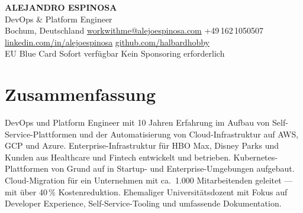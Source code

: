 \documentclass[a4paper,9pt]{extarticle}
\begin{document}
\color{darktext}
\thispagestyle{firstpage}


\noindent
{}%
\vspace*{-1.0cm}
\begin{center}
  {\LARGE\bfseries\color{headerwhite}ALEJANDRO ESPINOSA}\\[0.3em]
  {\large\lightfont\color{accent}DevOps \& Platform Engineer}\\[0.55em]
  {\small\color{headerwhite}%
    Bochum, Deutschland\enspace{\color{accent}|}\enspace
    \href{mailto:workwithme@alejoespinosa.com}{\color{headerwhite}workwithme@alejoespinosa.com}\enspace{\color{accent}|}\enspace
    +49\,162\,1050507\\[0.2em]
    \href{https://www.linkedin.com/in/alejoespinosa}{\color{headerwhite}linkedin.com/in/alejoespinosa}\enspace{\color{accent}|}\enspace
    \href{https://github.com/halbardhobby}{\color{headerwhite}github.com/halbardhobby}
  }\\[0.45em]
  {\small\mediumfont\color{accent}EU Blue Card\enspace{\color{headerwhite}|}\enspace
  \color{accent}Sofort verf\"ugbar\enspace{\color{headerwhite}|}\enspace
  \color{accent}Kein Sponsoring erforderlich}
\end{center}
\vspace{0.3cm}


\section{Zusammenfassung}

DevOps und Platform Engineer mit 10 Jahren Erfahrung im Aufbau von Self-Service-Plattformen und der Automatisierung von Cloud-Infrastruktur auf AWS, GCP und Azure. Enterprise-Infrastruktur f\"ur HBO Max, Disney Parks und Kunden aus Healthcare und Fintech entwickelt und betrieben. Kubernetes-Plattformen von Grund auf in Startup- und Enterprise-Umgebungen aufgebaut. Cloud-Migration f\"ur ein Unternehmen mit ca.\ 1.000 Mitarbeitenden geleitet --- mit \"uber 40\,\% Kostenreduktion. Ehemaliger Universit\"atsdozent mit Fokus auf Developer Experience, Self-Service-Tooling und umfassende Dokumentation.
\end{document}
